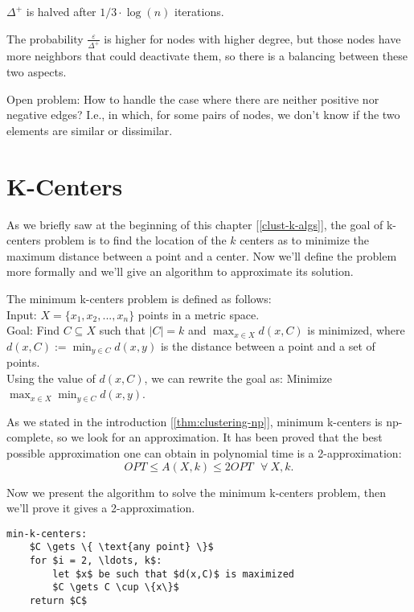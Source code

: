 \begin{thm}
    $\Delta^+$ is halved after $1/3 \cdot \log(n)$ iterations.
\end{thm}

\obs The probability $\frac{\varepsilon}{\Delta^+}$ is higher for nodes with higher degree, but those nodes have more neighbors that could deactivate them, so there is a balancing between these two aspects.

Open problem: How to handle the case where there are neither positive nor negative edges? I.e., in which, for some pairs of nodes, we don't know if the two elements are similar or dissimilar.


\section{K-Centers}\label{sec:k-centers}

As we briefly saw at the beginning of this chapter [\ref{clust-k-algs}], the goal of k-centers problem is to find the location of the $k$ centers as to minimize the maximum distance between a point and a center. Now we'll define the problem more formally and we'll give an algorithm to approximate its solution.

\begin{defn}\label{defn:k-centers}
    The minimum k-centers problem is defined as follows:\\
    Input: $X = \{x_1, x_2, ..., x_n\}$ points in a metric space.\\
    Goal: Find $C \subseteq X$ such that $|C| = k$ and $\max_{x \in X} d(x,C)$ is minimized, where $d(x,C) := \min_{y \in C} d(x,y)$ is the distance between a point and a set of points.\\
    Using the value of $d(x,C)$, we can rewrite the goal as: Minimize $\max_{x \in X} \min_{y \in C} d(x, y)$.
\end{defn}

As we stated in the introduction [\ref{thm:clustering-np}], minimum k-centers is np-complete, so we look for an approximation. It has been proved that the best possible approximation one can obtain in polynomial time is a 2-approximation: $$OPT \leq A(X,k) \leq 2 OPT \ \ \ \forall\ X,k.$$

Now we present the algorithm to solve the minimum k-centers problem, then we'll prove it gives a 2-approximation.

\begin{lstlisting}[caption={Minimum k-centers}, label={lst:min-k-centers}]
min-k-centers:
    $C \gets \{ \text{any point} \}$
    for $i = 2, \ldots, k$:
        let $x$ be such that $d(x,C)$ is maximized
        $C \gets C \cup \{x\}$
    return $C$
\end{lstlisting}

